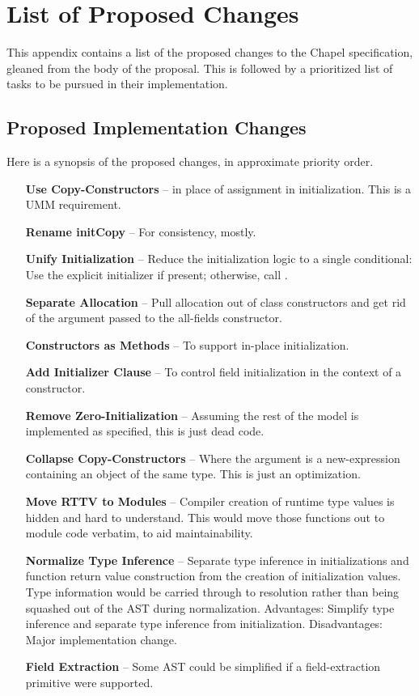 \section{List of Proposed Changes}
\label{Changes}

This appendix contains a list of the proposed changes to the Chapel specification,
gleaned from the body of the proposal.  This is followed by a prioritized list of tasks to
be pursued in their implementation.

\subsection{Proposed Implementation Changes}
Here is a synopsis of the proposed changes, in approximate priority order.
\begin{itemize}[leftmargin=2.5cm]
\item[\bf Use Copy-Constructors] -- in place of assignment in initialization.  This is a UMM requirement.
\item[\bf Rename initCopy] -- For consistency, mostly.
\item[\bf Unify Initialization] -- Reduce the initialization logic to a single conditional:
  Use the explicit initializer if present; otherwise, call .
\item[\bf Separate Allocation] -- Pull allocation out of class constructors and get rid of the
   argument passed to the all-fields constructor.
\item[\bf Constructors as Methods] -- To support in-place initialization.
\item[\bf Add Initializer Clause] -- To control field initialization in the context of a
  constructor.
\item[\bf Remove Zero-Initialization] -- Assuming the rest of the model is implemented as
  specified, this is just dead code.
\item[\bf Collapse Copy-Constructors] -- Where the argument is a new-expression containing
  an object of the same type.  This is just an optimization.
\item[\bf Move RTTV to Modules] -- Compiler creation of runtime type values is hidden and hard
  to understand.  This would move those functions out to module code verbatim, to aid
  maintainability.
\item[\bf Normalize Type Inference] -- Separate type inference in initializations and function
  return value construction from the creation of initialization values.  Type information
  would be carried through to resolution rather than being squashed out of the AST during
  normalization.  Advantages: Simplify type inference and separate type inference from
  initialization.  Disadvantages: Major implementation change.
\item[\bf Field Extraction] -- Some AST could be simplified if a field-extraction primitive
  were supported.
\end{itemize}

